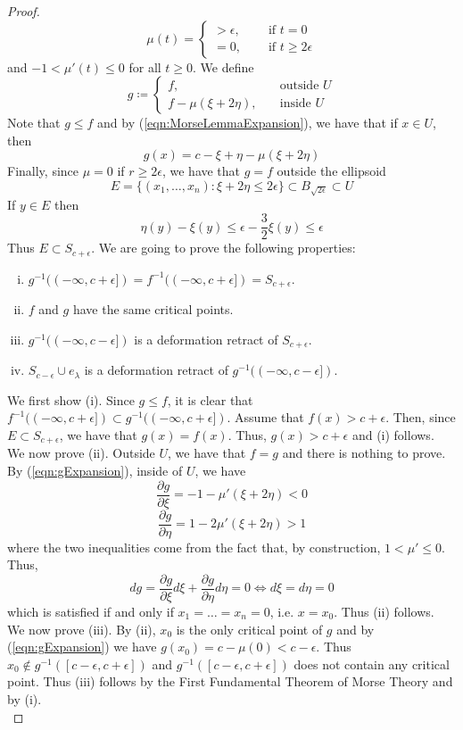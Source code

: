 \documentclass[10pt]{article}
\theoremstyle{plain}
\theoremstyle{definition}
\newcommand{\myif}{\text{ if }}
\newcommand{\deriv}{d}
\newcommand{\deta}{\deriv\eta}
\newcommand{\parderivof}[2]{\frac{\partial {#1}}{\partial {#2}}}
\newcommand{\mycasesthing}[2]{\begin{cases} #1 \\ #2\end{cases}}
\newcommand{\finv}{f^{-1}}
\newcommand{\xcoords}{x_1,\ldots,x_n}
\begin{document}
\begin{proof}
        $$\mu(t) = \mycasesthing{> \epsilon,& \quad \myif t = 0}{=0,& \quad \myif t \geq 2 \epsilon}$$
    and $-1<\mu'(t) \leq 0$ for all $t\geq 0$. We define 
        $$g \coloneqq \mycasesthing{f,&\quad \text{outside } U}{f - \mu(\xi + 2\eta), &\quad \text{inside } U}$$
    Note that $g \leq f$ and by (\ref{eqn:MorseLemmaExpansion}), we have that if $x\in U$, then
    \begin{equation}\label{eqn:gExpansion}
        g(x) = c - \xi + \eta - \mu(\xi + 2 \eta)
    \end{equation}
    Finally, since $\mu = 0$ if $r \geq 2\epsilon$, we have that $g =f$ outside the ellipsoid 
        $$E = \{(\xcoords): \xi + 2 \eta \leq 2\epsilon\} \subset B_{\sqrt{2\epsilon}} \subset U$$
    If $y\in E$ then 
        $$\eta(y) - \xi (y) \leq \epsilon - \frac{3}{2} \xi(y) \leq \epsilon$$
    Thus $E \subset S_{c+\epsilon}$. We are going to prove the following properties:
    \begin{enumerate}[(i)]
        \item $g^{-1}((-\infty,c+\epsilon]) = \finv((-\infty,c+\epsilon]) = S_{c+\epsilon}$.
        \item $f$ and $g$ have the same critical points.
        \item $g^{-1}((-\infty,c-\epsilon])$ is a deformation retract of $S_{c+\epsilon}$.
        \item $S_{c-\epsilon} \cup e_\lambda$ is a deformation retract of $g^{-1}((-\infty,c-\epsilon])$.
    \end{enumerate}
    We first show (i). Since $g \leq f$, it is clear that $\finv((-\infty,c+\epsilon]) \subset g^{-1}((-\infty,c+\epsilon])$. Assume that $f(x) > c+\epsilon$. Then, since $E\subset S_{c+\epsilon}$, we have that $g(x) = f(x)$. Thus, $g(x) > c+ \epsilon$ and (i) follows.\\
    We now prove (ii). Outside $U$, we have that $f=g$ and there is nothing to prove. By (\ref{eqn:gExpansion}), inside of $U$, we have
        $$\parderivof{g}{\xi} = -1 - \mu'(\xi + 2\eta) < 0$$
        $$\parderivof{g}{\eta} = 1 -2\mu'(\xi + 2\eta) > 1$$
    where the two inequalities come from the fact that, by construction, $1<\mu'\leq 0$. Thus, 
        $$\deriv g = \parderivof{g}{\xi} \deriv \xi + \parderivof{g}{\eta} \deta = 0 \iff \deriv \xi = \deta = 0$$
    which is satisfied if and only if $x_1 = \dots = x_n =0$, i.e. $x = x_0$. Thus (ii) follows.\\
    We now prove (iii). By (ii), $x_0$ is the only critical point of $g$ and by (\ref{eqn:gExpansion}) we have $g(x_0) = c - \mu(0) < c- \epsilon$. Thus $x_0 \not\in g^{-1}([c-\epsilon,c+\epsilon])$ and $g^{-1}([c-\epsilon,c+\epsilon])$ does not contain any critical point. Thus (iii) follows by the First Fundamental Theorem of Morse Theory and by (i).\\

\end{proof}
\end{document}
